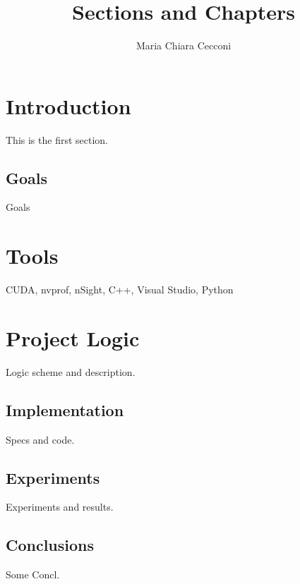 \documentclass{article}
\title{Sections and Chapters}
\author{Maria Chiara Cecconi}
\date{ }
\begin{document}
 
\maketitle
 
\tableofcontents
 
\chapter{Introduction}
 This is the first section.
\section{Goals}
Goals
 
\chapter*{Tools}
 
CUDA, nvprof, nSight, C++, Visual Studio, Python
 
\chapter{Project Logic}
 
Logic scheme and description.

\section{Implementation}

Specs and code.

\section{Experiments}

Experiments and results.

\section{Conclusions}

Some Concl.
 
\end{document}

